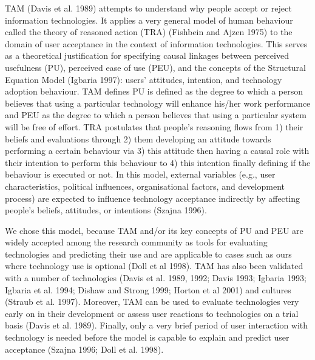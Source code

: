 \documentclass[11pt]{article}
\begin{document}
TAM (Davis et al. 1989) attempts to understand why people accept or reject information technologies. It applies a very general model of human behaviour called the theory of reasoned action (TRA) (Fishbein and Ajzen 1975) to the domain of user acceptance in the context of information technologies. This serves as a theoretical justification for specifying causal linkages between perceived usefulness (PU), perceived ease of use (PEU),  and the concepts of the Structural Equation Model (Igbaria 1997): users’ attitudes, intention, and technology adoption behaviour. TAM defines PU is defined as the degree to which a person believes that using a particular technology will enhance his/her work performance and PEU as the degree to which a person believes that using a particular system will be free of effort. TRA postulates that people’s reasoning flows from 1) their beliefs and evaluations through 2) them developing an attitude towards performing a certain behaviour via 3) this attitude then having a causal role with their intention to perform this behaviour to 4) this intention finally defining if the behaviour is executed or not. In this model, external variables (e.g., user characteristics, political influences, organisational factors, and development process) are expected to influence technology acceptance indirectly by affecting people’s beliefs, attitudes, or intentions (Szajna 1996).

We chose this model, because TAM and/or its key concepts of PU and PEU are widely accepted among the research community as tools for evaluating technologies and predicting their use and are applicable to cases such as ours where technology use is optional (Doll et al 1998). TAM has also been validated with a number of technologies (Davis et al. 1989, 1992; Davis 1993; Igbaria 1993; Igbaria et al. 1994; Dishaw and Strong 1999; Horton et al 2001) and cultures (Straub et al. 1997). Moreover, TAM can be used to evaluate technologies very early on in their development or assess user reactions to technologies on a trial basis (Davis et al. 1989). Finally, only a very brief period of user interaction with technology is needed before the model is capable to explain and predict user acceptance (Szajna 1996; Doll et al. 1998).
\end{document}
